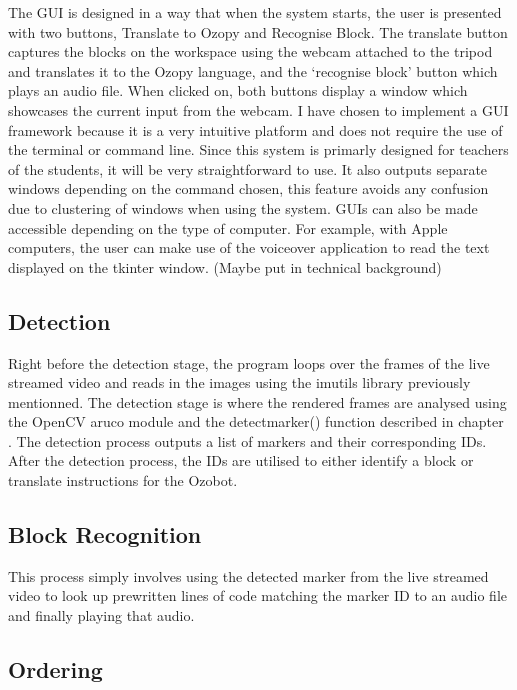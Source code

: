 \documentclass[oneside,%
                    author={Malak Hajji},
                    degree={BSc},
                    title={Designing An Accessible Computational Toolkit For Students},
                  subtitle={With Mixed Visual Abilities}]{dissertation}
\begin{document}
The GUI is designed in a way that when the system starts, the user is presented with two buttons, Translate to Ozopy and Recognise Block. The translate button captures the blocks on the workspace using the webcam attached to the tripod and translates it to the Ozopy language, and the ‘recognise block’ button which plays an audio file. When clicked on, both buttons display a window which showcases the current input from the webcam.  
I have chosen to implement a GUI framework because it is a very intuitive platform and does not require the use of the terminal or command line. Since this system is primarly designed for teachers of the students, it will be very straightforward to use. It also outputs separate windows depending on the command chosen, this feature avoids any confusion due to clustering of windows when using the system.  
GUIs can also be made accessible depending on the type of computer. For example, with Apple computers, the user can make use of the voiceover application to read the text displayed on the tkinter window. (Maybe put in technical background) 
  
\subsection{Detection} 
 
Right before the detection stage, the program loops over the frames of the live streamed video and reads in the images using the imutils library previously mentionned. The detection stage is where the rendered frames are analysed using the OpenCV aruco module and the detectmarker() function described in chapter . 
The detection process outputs a list of markers and their corresponding IDs. 
After the detection process, the IDs are utilised to either identify a block or translate instructions for the Ozobot. 
 
\subsection{Block Recognition}
 
This process simply involves using the detected marker from the live streamed video to look up prewritten lines of code matching the marker ID to an audio file and finally playing that audio. 
 
\subsection{Ordering} 
 
\end{document}
